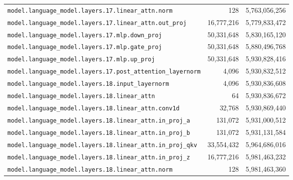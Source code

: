 \documentclass[10pt,a4paper]{article}
\theoremstyle{definition}
\begin{document}
\begin{appendices}
\begin{longtable}{p{9.5cm}rr}
\texttt{model.\allowbreak{}language\_model.\allowbreak{}layers.\allowbreak{}17.\allowbreak{}linear\_attn.\allowbreak{}norm} & 128 & 5,763,056,256 \\
\texttt{model.\allowbreak{}language\_model.\allowbreak{}layers.\allowbreak{}17.\allowbreak{}linear\_attn.\allowbreak{}out\_proj} & 16,777,216 & 5,779,833,472 \\
\texttt{model.\allowbreak{}language\_model.\allowbreak{}layers.\allowbreak{}17.\allowbreak{}mlp.\allowbreak{}down\_proj} & 50,331,648 & 5,830,165,120 \\
\texttt{model.\allowbreak{}language\_model.\allowbreak{}layers.\allowbreak{}17.\allowbreak{}mlp.\allowbreak{}gate\_proj} & 50,331,648 & 5,880,496,768 \\
\texttt{model.\allowbreak{}language\_model.\allowbreak{}layers.\allowbreak{}17.\allowbreak{}mlp.\allowbreak{}up\_proj} & 50,331,648 & 5,930,828,416 \\
\texttt{model.\allowbreak{}language\_model.\allowbreak{}layers.\allowbreak{}17.\allowbreak{}post\_attention\_layernorm} & 4,096 & 5,930,832,512 \\
\texttt{model.\allowbreak{}language\_model.\allowbreak{}layers.\allowbreak{}18.\allowbreak{}input\_layernorm} & 4,096 & 5,930,836,608 \\
\texttt{model.\allowbreak{}language\_model.\allowbreak{}layers.\allowbreak{}18.\allowbreak{}linear\_attn} & 64 & 5,930,836,672 \\
\texttt{model.\allowbreak{}language\_model.\allowbreak{}layers.\allowbreak{}18.\allowbreak{}linear\_attn.\allowbreak{}conv1d} & 32,768 & 5,930,869,440 \\
\texttt{model.\allowbreak{}language\_model.\allowbreak{}layers.\allowbreak{}18.\allowbreak{}linear\_attn.\allowbreak{}in\_proj\_a} & 131,072 & 5,931,000,512 \\
\texttt{model.\allowbreak{}language\_model.\allowbreak{}layers.\allowbreak{}18.\allowbreak{}linear\_attn.\allowbreak{}in\_proj\_b} & 131,072 & 5,931,131,584 \\
\texttt{model.\allowbreak{}language\_model.\allowbreak{}layers.\allowbreak{}18.\allowbreak{}linear\_attn.\allowbreak{}in\_proj\_qkv} & 33,554,432 & 5,964,686,016 \\
\texttt{model.\allowbreak{}language\_model.\allowbreak{}layers.\allowbreak{}18.\allowbreak{}linear\_attn.\allowbreak{}in\_proj\_z} & 16,777,216 & 5,981,463,232 \\
\texttt{model.\allowbreak{}language\_model.\allowbreak{}layers.\allowbreak{}18.\allowbreak{}linear\_attn.\allowbreak{}norm} & 128 & 5,981,463,360 \\

\end{longtable}
\end{appendices}
\end{document}
